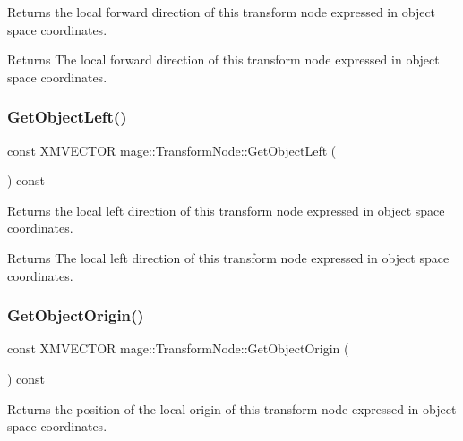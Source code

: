 Returns the local forward direction of this transform node expressed in object space coordinates.

\begin{DoxyReturn}{Returns}
The local forward direction of this transform node expressed in object space coordinates. 
\end{DoxyReturn}
\hypertarget{structmage_1_1_transform_node_a674580a5f7f8926e5b1e9ce7ac312cb2}{}\label{structmage_1_1_transform_node_a674580a5f7f8926e5b1e9ce7ac312cb2} 
\subsubsection{\texorpdfstring{Get\+Object\+Left()}{GetObjectLeft()}}
{\footnotesize\ttfamily const X\+M\+V\+E\+C\+T\+OR mage\+::\+Transform\+Node\+::\+Get\+Object\+Left (\begin{DoxyParamCaption}{ }\end{DoxyParamCaption}) const\hspace{0.3cm}{\ttfamily [noexcept]}}

Returns the local left direction of this transform node expressed in object space coordinates.

\begin{DoxyReturn}{Returns}
The local left direction of this transform node expressed in object space coordinates. 
\end{DoxyReturn}
\hypertarget{structmage_1_1_transform_node_a5f97b639779c4b9d24e144f1d8c9da12}{}\label{structmage_1_1_transform_node_a5f97b639779c4b9d24e144f1d8c9da12} 
\subsubsection{\texorpdfstring{Get\+Object\+Origin()}{GetObjectOrigin()}}
{\footnotesize\ttfamily const X\+M\+V\+E\+C\+T\+OR mage\+::\+Transform\+Node\+::\+Get\+Object\+Origin (\begin{DoxyParamCaption}{ }\end{DoxyParamCaption}) const\hspace{0.3cm}{\ttfamily [noexcept]}}

Returns the position of the local origin of this transform node expressed in object space coordinates.

